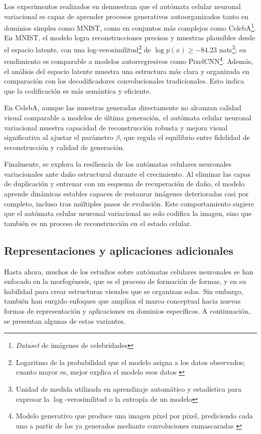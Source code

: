 Los experimentos realizados en \cite{rasmus2022_vnca} demuestran que el autómata celular neuronal variacional es capaz de aprender procesos generativos autoorganizados tanto en dominios simples como MNIST, como en conjuntos más complejos como CelebA\footnote{\textit{Dataset} de imágenes de celebridades}. En MNIST, el modelo logra reconstrucciones precisas y muestras plausibles desde el espacio latente, con una log-verosimilitud\footnote{Logaritmo de la probabilidad que el modelo asigna a los datos observados; cuanto mayor es, mejor explica el modelo esos datos \cite{goodfellow2016_dl}} de $\log p(x) \geq -84.23$ nats\footnote{Unidad de medida utilizada en aprendizaje automático y estadística para expresar la $\log$-verosimilitud o la entropía de un modelo}; su rendimiento es comparable a modelos autorregresivos como PixelCNN\footnote{Modelo generativo que produce una imagen píxel por píxel, prediciendo cada uno a partir de los ya generados mediante convoluciones enmascaradas \cite{oord2016_pixelcnn}}. Además, el análisis del espacio latente muestra una estructura más clara y organizada en comparación con los decodificadores convolucionales tradicionales. Esto indica que la codificación es más semántica y eficiente.

En CelebA, aunque las muestras generadas directamente no alcanzan calidad visual comparable a modelos de última generación, el autómata celular neuronal variacional muestra capacidad de reconstrucción robusta y mejora visual significativa al ajustar el parámetro $\beta$, que regula el equilibrio entre fidelidad de reconstrucción y calidad de generación. 

Finalmente, se explora la resiliencia de los autómatas celulares neuronales variacionales ante daño estructural durante el crecimiento. Al eliminar las capas de duplicación y entrenar con un esquema de recuperación de daño, el modelo aprende dinámicas estables capaces de restaurar imágenes deterioradas casi por completo, incluso tras múltiples pasos de evolución. Este comportamiento sugiere que el autómata celular neuronal variacional no solo codifica la imagen, sino que también es un proceso de reconstrucción en el estado celular.

\subsection{Representaciones y aplicaciones adicionales}

Hasta ahora, muchos de los estudios sobre autómatas celulares neuronales se han enfocado en la morfogénesis, que es el proceso de formación de formas, y en su habilidad para crear estructuras visuales que se organizan solas. Sin embargo, también han surgido enfoques que amplían el marco conceptual hacia nuevas formas de representación y aplicaciones en dominios específicos. A continuación, se presentan algunas de estas variantes.

